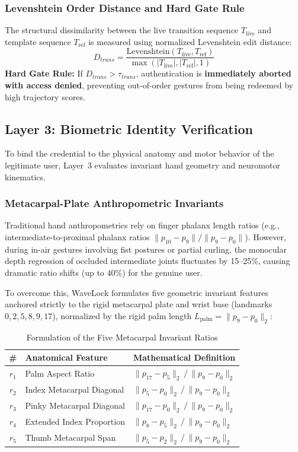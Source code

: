 \documentclass[conference]{IEEEtran}
\begin{document}
\subsubsection{Levenshtein Order Distance and Hard Gate Rule}
The structural dissimilarity between the live transition sequence $T_{\text{live}}$ and template sequence $T_{\text{ref}}$ is measured using normalized Levenshtein edit distance:
\begin{equation}
D_{trans} = \frac{\text{Levenshtein}(T_{\text{live}}, T_{\text{ref}})}{\max(|T_{\text{live}}|, |T_{\text{ref}}|, 1)}
\label{eq:levenshtein}
\end{equation}
\textbf{Hard Gate Rule:} If $D_{trans} > \tau_{trans}$, authentication is \textbf{immediately aborted with access denied}, preventing out-of-order gestures from being redeemed by high trajectory scores.

\subsection{Layer 3: Biometric Identity Verification}

To bind the credential to the physical anatomy and motor behavior of the legitimate user, Layer~3 evaluates invariant hand geometry and neuromotor kinematics.

\subsubsection{Metacarpal-Plate Anthropometric Invariants}
Traditional hand anthropometrics rely on finger phalanx length ratios (e.g., intermediate-to-proximal phalanx ratios $\|p_{10}-p_9\| / \|p_9-p_0\|$). However, during in-air gestures involving fist postures or partial curling, the monocular depth regression of occluded intermediate joints fluctuates by 15--25\%, causing dramatic ratio shifts (up to 40\%) for the genuine user.

To overcome this, WaveLock formulates five geometric invariant features anchored strictly to the rigid metacarpal plate and wrist base (landmarks $0, 2, 5, 8, 9, 17$), normalized by the rigid palm length $L_{\text{palm}} = \|p_9 - p_0\|_2$:

\begin{table}[h]
\centering
\caption{Formulation of the Five Metacarpal Invariant Ratios}
\label{tab:anthro_formulas}
\small
\begin{tabular}{@{}clp{4.2cm}@{}}
\toprule
\textbf{\#} & \textbf{Anatomical Feature} & \textbf{Mathematical Definition} \\
\midrule
$r_1$ & Palm Aspect Ratio & $\|p_{17} - p_5\|_2 \,/\, \|p_9 - p_0\|_2$ \\
$r_2$ & Index Metacarpal Diagonal & $\|p_5 - p_0\|_2 \,/\, \|p_9 - p_0\|_2$ \\
$r_3$ & Pinky Metacarpal Diagonal & $\|p_{17} - p_0\|_2 \,/\, \|p_9 - p_0\|_2$ \\
$r_4$ & Extended Index Proportion & $\|p_8 - p_5\|_2 \,/\, \|p_9 - p_0\|_2$ \\
$r_5$ & Thumb Metacarpal Span & $\|p_5 - p_2\|_2 \,/\, \|p_9 - p_0\|_2$ \\
\bottomrule
\end{tabular}
\end{table}
\end{document}
